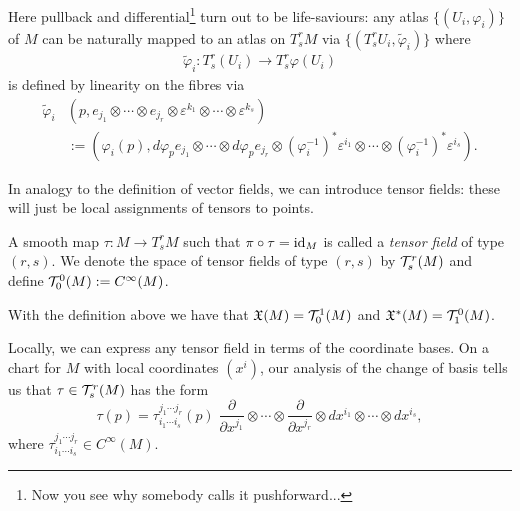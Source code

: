 Here pullback and differential\footnote{Now you see why somebody calls it pushforward...} turn out to be life-saviours:
any atlas $\{(U_i, \varphi_i)\}$ of $M$ can be naturally mapped to an atlas  on $T_s^r M$ via $\{(T_s^r U_i, \widetilde\varphi_i)\}$ where
\begin{align}
  \widetilde\varphi_i : T_s^r(U_i) \to T_s^r\varphi(U_i)
\end{align}
is defined by linearity on the fibres via
\begin{align}
  \widetilde\varphi_i&(p, e_{j_1}\otimes\cdots\otimes e_{j_r}\otimes \varepsilon^{k_1}\otimes \cdots\otimes \varepsilon^{k_s})\\
  &:=(\varphi_i(p), d\varphi_p e_{j_1}\otimes\cdots\otimes d\varphi_p e_{j_r}\otimes (\varphi_i^{-1})^*\varepsilon^{i_1}\otimes \cdots\otimes (\varphi_i^{-1})^*\varepsilon^{i_s}).
\end{align}

In analogy to the definition of vector fields, we can introduce tensor fields: these will just be local assignments of tensors to points.

\begin{definition}
  A smooth map $\tau : M \to T_s^r M$ such that $\pi\circ \tau = \operatorname{id}_M$ is called a \emph{tensor field} of type $(r,s)$.
  We denote the space of tensor fields of type $(r,s)$ by $\mathcal{T}_s^r(M)$ and define $\mathcal{T}_0^0(M) := C^\infty(M)$.
\end{definition}

\begin{example}
  With the definition above we have that $\mathfrak{X}(M) = \mathcal{T}_0^1(M)$ and $\mathfrak{X}^*(M) = \mathcal{T}_1^0(M)$.
\end{example}

Locally, we can express any tensor field in terms of the coordinate bases.
On a chart for $M$ with local coordinates $(x^i)$, our analysis of the change of basis tells us that $\tau\in\mathcal{T}_s^r(M)$ has the form
\begin{equation}
  \tau(p) = \tau^{j_1\cdots j_r}_{i_1\cdots i_s}(p)\; \frac{\partial}{\partial x^{j_1}}\otimes\cdots\otimes\frac{\partial}{\partial x^{j_r}}\otimes dx^{i_1}\otimes\cdots\otimes dx^{i_s},
\end{equation}
where $\tau^{j_1\cdots j_r}_{i_1\cdots i_s}\in C^\infty(M)$.

